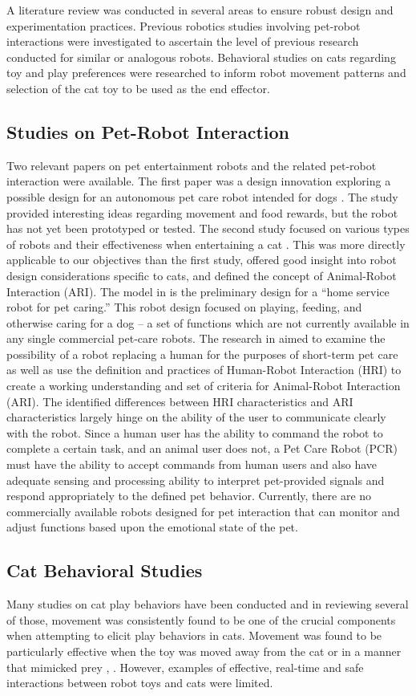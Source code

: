 A literature review was conducted in several areas to ensure robust design and experimentation practices.  Previous robotics studies involving pet-robot interactions were investigated to ascertain the level of previous research conducted for similar or analogous robots. Behavioral studies on cats regarding toy and play preferences were researched to inform robot movement patterns and selection of the cat toy to be used as the end effector. 

\subsection{Studies on Pet-Robot Interaction}
Two relevant papers on pet entertainment robots and the related pet-robot interaction were available. The first paper was a design innovation exploring a possible design for an autonomous pet care robot intended for dogs \cite{deng2020design}. The study provided interesting ideas regarding movement and food rewards, but the robot has not yet been prototyped or tested. The second study focused on various types of robots and their effectiveness when entertaining a cat \cite{kim2009animal}. This was more directly applicable to our objectives than the first study, offered good insight into robot design considerations specific to cats, and defined the concept of Animal-Robot Interaction (ARI). 
The model in \cite{deng2020design} is the preliminary design for a “home service robot for pet caring.” This robot design focused on playing, feeding, and otherwise caring for a dog – a set of functions which are not currently available in any single commercial pet-care robots. The research in \cite{kim2009animal} aimed to examine the possibility of a robot replacing a human for the purposes of short-term pet care as well as use the definition and practices of Human-Robot Interaction (HRI) to create a working understanding and set of criteria for Animal-Robot Interaction (ARI). The identified differences between HRI characteristics and ARI characteristics largely hinge on the ability of the user to communicate clearly with the robot. Since a human user has the ability to command the robot to complete a certain task, and an animal user does not, a Pet Care Robot (PCR) must have the ability to accept commands from human users and also have adequate sensing and processing ability to interpret pet-provided signals and respond appropriately to the defined pet behavior. Currently, there are no commercially available robots designed for pet interaction that can monitor and adjust functions based upon the emotional state of the pet.

\subsection{Cat Behavioral Studies}
Many studies on cat play behaviors have been conducted and in reviewing several of those, movement was consistently found to be one of the crucial components when attempting to elicit play behaviors in cats. Movement was found to be particularly effective when the toy was moved away from the cat or in a manner that mimicked prey \cite{rochlitz2005review}, \cite{leyhausen1979cat}. However, examples of effective, real-time and safe interactions between robot toys and cats were limited.